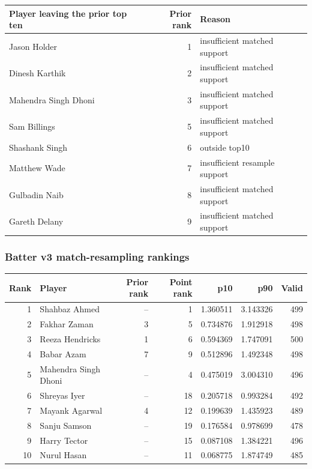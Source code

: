 \begin{center}
\begin{tabularx}{\linewidth}{>{\raggedright\arraybackslash}Xr>{\raggedright\arraybackslash}X}
\toprule
Player leaving the prior top ten & Prior rank & Reason \\
\midrule
Jason Holder & 1 & insufficient matched support \\
Dinesh Karthik & 2 & insufficient matched support \\
Mahendra Singh Dhoni & 3 & insufficient matched support \\
Sam Billings & 5 & insufficient matched support \\
Shashank Singh & 6 & outside top10 \\
Matthew Wade & 7 & insufficient resample support \\
Gulbadin Naib & 8 & insufficient matched support \\
Gareth Delany & 9 & insufficient matched support \\
\bottomrule
\end{tabularx}
\end{center}

\clearpage

\subsubsection*{Batter v3 match-resampling rankings}

\begin{center}
\begin{tabularx}{\linewidth}{r>{\raggedright\arraybackslash}Xrrrrr}
\toprule
Rank & Player & Prior rank & Point rank & p10 & p90 & Valid \\
\midrule
1 & Shahbaz Ahmed & -- & 1 & 1.360511 & 3.143326 & 499 \\
2 & Fakhar Zaman & 3 & 5 & 0.734876 & 1.912918 & 498 \\
3 & Reeza Hendricks & 1 & 6 & 0.594369 & 1.747091 & 500 \\
4 & Babar Azam & 7 & 9 & 0.512896 & 1.492348 & 498 \\
5 & Mahendra Singh Dhoni & -- & 4 & 0.475019 & 3.004310 & 496 \\
6 & Shreyas Iyer & -- & 18 & 0.205718 & 0.993284 & 492 \\
7 & Mayank Agarwal & 4 & 12 & 0.199639 & 1.435923 & 489 \\
8 & Sanju Samson & -- & 19 & 0.176584 & 0.978699 & 478 \\
9 & Harry Tector & -- & 15 & 0.087108 & 1.384221 & 496 \\
10 & Nurul Hasan & -- & 11 & 0.068775 & 1.874749 & 485 \\
\bottomrule
\end{tabularx}
\end{center}

